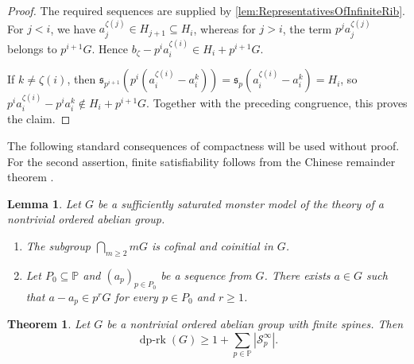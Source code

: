 \documentclass{article}
\theoremstyle{definition}
\theoremstyle{remark}
\theoremstyle{plain}
\newtheorem{thm}[dfn]{Theorem}
\newtheorem{lem}[dfn]{Lemma}
\begin{document}
\begin{proof}
	The required sequences are supplied by \autoref{lem:RepresentativesOfInfiniteRib}.
	For $j<i$, we have $a_j^{\zeta(j)}\in H_{j+1}\subseteq H_i$, whereas for $j>i$, the term $p^ja_j^{\zeta(j)}$ belongs to $p^{i+1}G$.
	Hence $b_\zeta-p^ia_i^{\zeta(i)}\in H_i+p^{i+1}G$.

	If $k\neq\zeta(i)$, then $\mathfrak{s}_{p^{i+1}}(p^i (a_i^{\zeta(i)}-a_i^k)) = \mathfrak{s}_{p}(a_i^{\zeta(i)}-a_i^k) = H_i$, so $p^i a_i^{\zeta(i)} - p^i a_i^k\notin H_i+p^{i+1}G$.
	Together with the preceding congruence, this proves the claim.
\end{proof}

The following standard consequences of compactness will be used without proof.
For the second assertion, finite satisfiability follows from the Chinese remainder theorem \cite[Lemma 2.1(2)]{Okura2026DisOrd}.

\begin{lem}\label{lem:CofinalDivisibleTranslations}
	Let $G$ be a sufficiently saturated monster model of the theory of a nontrivial ordered abelian group.
	\begin{enumerate}
		\item The subgroup $\bigcap_{m\geq 2}mG$ is cofinal and coinitial in $G$.
		\item Let $P_0\subseteq\mathbb{P}$ and $(a_p)_{p\in P_0}$ be a sequence from $G$.
		There exists $a\in G$ such that $a-a_p\in p^rG$ for every $p\in P_0$ and $r\geq 1$.
	\end{enumerate}
\end{lem}

\begin{thm}\label{thm:LowerBoundFiniteSpines}
	Let $G$ be a nontrivial ordered abelian group with finite spines.
	Then
	\[
		\operatorname{dp\text{-}rk}(G)
		\geq
		1+\sum_{p\in\mathbb{P}}\left|\mathcal{S}_p^\infty\right|.
	\]
\end{thm}
\end{document}
